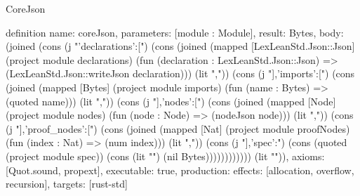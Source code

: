 \begin{lexlean}{CoreJson}
\begin{semanticmodule}
definition{
  name: coreJson,
  parameters: [module : Module],
  result: Bytes,
  body: (joined (cons (j "{'declarations':[") (cons (joined (mapped [LexLeanStd.Json::Json] (project module declarations) (fun (declaration : LexLeanStd.Json::Json) => (LexLeanStd.Json::writeJson declaration))) (lit ",")) (cons (j "],'imports':[") (cons (joined (mapped [Bytes] (project module imports) (fun (name : Bytes) => (quoted name))) (lit ",")) (cons (j "],'nodes':[") (cons (joined (mapped [Node] (project module nodes) (fun (node : Node) => (nodeJson node))) (lit ",")) (cons (j "],'proof_nodes':[") (cons (joined (mapped [Nat] (project module proofNodes) (fun (index : Nat) => (num index))) (lit ",")) (cons (j "],'spec':") (cons (quoted (project module spec)) (cons (lit "}") (nil Bytes)))))))))))) (lit "")),
  axioms: [Quot.sound, propext],
  executable: true,
  production: {effects: [allocation, overflow, recursion], targets: [rust-std]}
}
\end{semanticmodule}
\end{lexlean}
